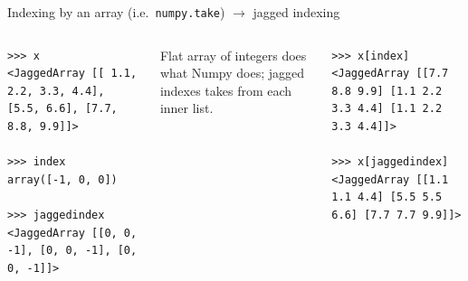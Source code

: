 \documentclass[aspectratio=169]{beamer}
\begin{document}
\begin{frame}[fragile]{Indexing by an array (i.e.\ \texttt{numpy.take}) $\to$ jagged indexing}
\small
\begin{columns}
\begin{verbatim}
>>> x
<JaggedArray [[ 1.1, 2.2, 3.3, 4.4], [5.5, 6.6], [7.7, 8.8, 9.9]]>

>>> index
array([-1, 0, 0])

>>> jaggedindex
<JaggedArray [[0, 0, -1], [0, 0, -1], [0, 0, -1]]>
\end{verbatim}

\vspace{0.5 cm}
\normalsize
Flat array of integers does what Numpy does; jagged indexes takes from each inner list.

\small
\begin{verbatim}
>>> x[index]
<JaggedArray [[7.7 8.8 9.9] [1.1 2.2 3.3 4.4] [1.1 2.2 3.3 4.4]]>

>>> x[jaggedindex]
<JaggedArray [[1.1 1.1 4.4] [5.5 5.5 6.6] [7.7 7.7 9.9]]>
\end{verbatim}
\end{columns}
\end{frame}
\end{document}

